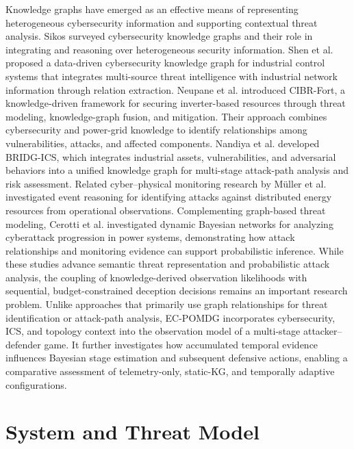 \documentclass[10pt,conference]{IEEEtran}
\begin{document}
Knowledge graphs have emerged as an effective means of representing heterogeneous cybersecurity information and supporting contextual threat analysis. Sikos \cite{Sikos2023} surveyed cybersecurity knowledge graphs and their role in integrating and reasoning over heterogeneous security information. Shen et al. \cite{Shen2020} proposed a data-driven cybersecurity knowledge graph for industrial control systems that integrates multi-source threat intelligence with industrial network information through relation extraction. Neupane et al. \cite{neupane2025ibr} introduced CIBR-Fort, a knowledge-driven framework for securing inverter-based resources through threat modeling, knowledge-graph fusion, and mitigation. Their approach combines cybersecurity and power-grid knowledge to identify relationships among vulnerabilities, attacks, and affected components. Nandiya et al. \cite{nandiya2026bridgics} developed BRIDG-ICS, which integrates industrial assets, vulnerabilities, and adversarial behaviors into a unified knowledge graph for multi-stage attack-path analysis and risk assessment. Related cyber--physical monitoring research by M\"{u}ller et al. \cite{muller2024cyphers} investigated event reasoning for identifying attacks against distributed energy resources from operational observations. Complementing graph-based threat modeling, Cerotti et al. \cite{cerotti2025dbn} investigated dynamic Bayesian networks for analyzing cyberattack progression in power systems, demonstrating how attack relationships and monitoring evidence can support probabilistic inference. While these studies advance semantic threat representation and probabilistic attack analysis, the coupling of knowledge-derived observation likelihoods with sequential, budget-constrained deception decisions remains an important research problem. Unlike approaches that primarily use graph relationships for threat identification or attack-path analysis, EC-POMDG incorporates cybersecurity, ICS, and topology context into the observation model of a multi-stage attacker--defender game. It further investigates how accumulated temporal evidence influences Bayesian stage estimation and subsequent defensive actions, enabling a comparative assessment of telemetry-only, static-KG, and temporally adaptive configurations.


\section{System and Threat Model}
\label{sec:system_model}
\end{document}
